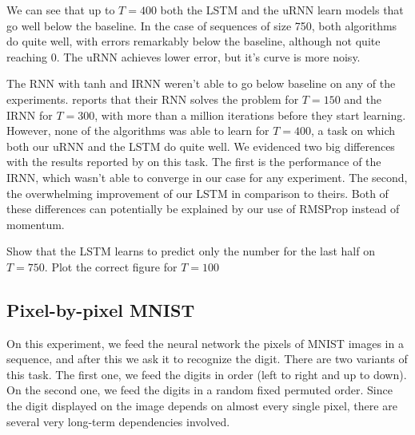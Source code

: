 \documentclass{article} %
\begin{document}
We can see that up to $T=400$ both the LSTM and the uRNN learn models that go well below the baseline. In the case of sequences of size 750, both algorithms do quite well, with errors remarkably below the baseline, although not quite reaching 0. The uRNN achieves lower error, but it's curve is more noisy.

The RNN with tanh and IRNN weren't able to go below baseline on any of the experiments. \cite{Quoc2015} reports that their RNN solves the problem for $T=150$ and the IRNN for $T=300$, with more than a million iterations before they start learning. However, none of the algorithms was able to learn for $T=400$, a task on which both our uRNN and the LSTM do quite well. We evidenced two big differences with the results reported by \cite{Quoc2015} on this task. The first is the performance of the IRNN, which wasn't able to converge in our case for any experiment. The second, the overwhelming improvement of our LSTM in comparison to theirs. Both of these differences can potentially be explained by our use of RMSProp instead of momentum.

{\color{red} Show that the LSTM learns to predict only the number for the last half on $T=750$. Plot the correct figure for $T=100$}

\subsection{Pixel-by-pixel MNIST}

On this experiment, we feed the neural network the pixels of MNIST \citep{MNIST} images in a sequence, and after this we ask it to recognize the digit. There are two variants of this task. The first one, we feed the digits in order (left to right and up to down). On the second one, we feed the digits in a random fixed permuted order. Since the digit displayed on the image depends on almost every single pixel, there are several very long-term dependencies involved.
\end{document}
